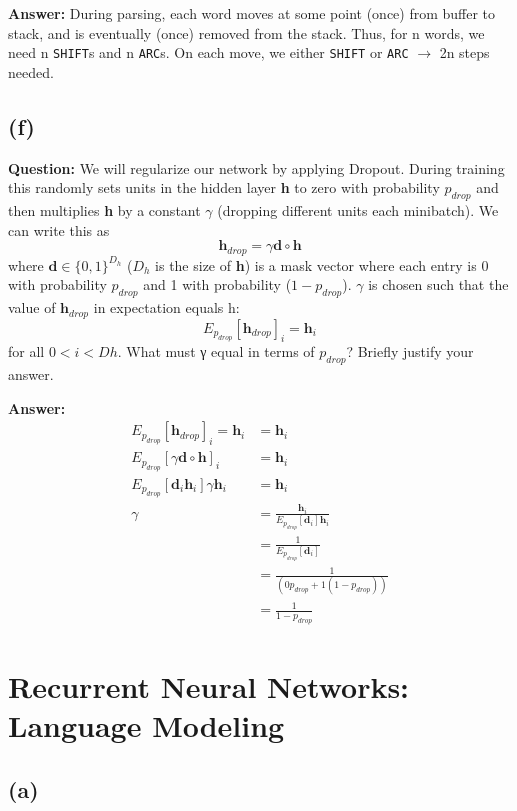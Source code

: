 \documentclass[11pt]{article}
\begin{document}
\textbf{Answer:} During parsing, each word moves at some point (once) from buffer to stack, and is eventually (once) removed from the stack. Thus, for n words, we need n \verb|SHIFT|s and n \verb|ARC|s. On each move, we either \verb|SHIFT| or \verb|ARC| $\to$ 2n steps needed.

\subsection*{(f)}
\textbf{Question:} We will regularize our network by applying Dropout. During training this randomly sets units in the hidden layer \textbf{h} to zero with probability $p_{drop}$ and then multiplies \textbf{h} by a constant $\gamma$ (dropping different units each minibatch). We can write this as \[\mathbf{h}_{drop} = \gamma \mathbf{d} \circ \mathbf{h}\] where $\mathbf{d} \in {\{0, 1\}}^{D_h}$ ($D_h$ is the size of \textbf{h}) is a mask vector where each entry is 0 with probability $p_{drop}$ and 1 with probability ($1 - p_{drop}$). $\gamma$ is chosen such that the value of $\mathbf{h}_{drop}$ in expectation equals h: \[E_{p_{drop}} [\mathbf{h}_{drop}]_i = \mathbf{h}_i\]
for all $0 < i < Dh$. What must γ equal in terms of $p_{drop}$? Briefly justify your answer.

\textbf{Answer:}
\begin{equation*}
  \begin{split}
    E_{p_{drop}} [\mathbf{h}_{drop}]_i = \mathbf{h}_i   &= \mathbf{h}_i \\
    E_{p_{drop}} [\gamma \mathbf{d} \circ \mathbf{h}]_i &= \mathbf{h}_i \\
    E_{p_{drop}} [\mathbf{d}_i \mathbf{h}_i] \gamma \mathbf{h}_i &= \mathbf{h}_i  \\
    \gamma &= \frac{ \mathbf{h}_i }{ E_{p_{drop}} [\mathbf{d}_i] \mathbf{h}_i }  \\
    &= \frac{ 1 }{ E_{p_{drop}} [\mathbf{d}_i] } \\
    &= \frac{ 1 }{ (0p_{drop} + 1(1-p_{drop})) } \\
    &= \frac{ 1 }{ 1-p_{drop} }
  \end{split}
\end{equation*}

\section{Recurrent Neural Networks: Language Modeling}
\subsection*{(a)}
\end{document}
